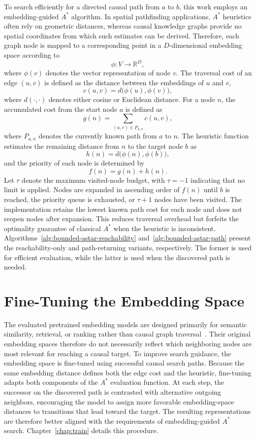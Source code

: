 To search efficiently for a directed causal path from $a$ to $b$, this work employs an embedding-guided $A^*$ algorithm. In spatial pathfinding applications, $A^*$ heuristics often rely on geometric distances, whereas causal knowledge graphs provide no spatial coordinates from which such estimates can be derived. Therefore, each graph node is mapped to a corresponding point in a $D$-dimensional embedding space according to
\[
\phi \colon V \rightarrow \mathbb{R}^{D},
\]
where $\phi(v)$ denotes the vector representation of node $v$. The traversal cost of an edge $(u,v)$ is defined as the distance between the embeddings of $u$ and $v$,
\[
c(u,v)=d\bigl(\phi(u),\phi(v)\bigr),
\]
where $d(\cdot,\cdot)$ denotes either cosine or Euclidean distance. For a node $n$, the accumulated cost from the start node $a$ is defined as
\[
g(n)=\sum_{(u,v)\in P_{a,n}} c(u,v),
\]
where $P_{a,n}$ denotes the currently known path from $a$ to $n$. The heuristic function estimates the remaining distance from $n$ to the target node $b$ as
\[
h(n)=d\bigl(\phi(n),\phi(b)\bigr),
\]
and the priority of each node is determined by
\[
f(n)=g(n)+h(n).
\]
Let $\tau$ denote the maximum visited-node budget, with $\tau=-1$ indicating that no limit is applied. Nodes are expanded in ascending order of $f(n)$ until $b$ is reached, the priority queue is exhausted, or $\tau+1$ nodes have been visited. The implementation retains the lowest known path cost for each node and does not reopen nodes after expansion. This reduces traversal overhead but forfeits the optimality guarantee of classical $A^*$ when the heuristic is inconsistent. Algorithms~\ref{alg:bounded-astar-reachability} and~\ref{alg:bounded-astar-path} present the reachability-only and path-returning variants, respectively. The former is used for efficient evaluation, while the latter is used when the discovered path is needed.

\section{Fine-Tuning the Embedding Space}
\label{sec:method_finetuning}

The evaluated pretrained embedding models are designed primarily for semantic similarity, retrieval, or ranking rather than causal graph traversal~\cite{allmpnet:modelcard,bge:modelcard,granite:modelcard,mxbai:modelcard,qwen3:modelcard}. Their original embedding spaces therefore do not necessarily reflect which neighboring nodes are most relevant for reaching a causal target. To improve search guidance, the embedding space is fine-tuned using successful causal search paths. Because the same embedding distance defines both the edge cost and the heuristic, fine-tuning adapts both components of the $A^*$ evaluation function. At each step, the successor on the discovered path is contrasted with alternative outgoing neighbors, encouraging the model to assign more favorable embedding-space distances to transitions that lead toward the target. The resulting representations are therefore better aligned with the requirements of embedding-guided $A^*$ search. Chapter~\ref{chap:train} details this procedure.

